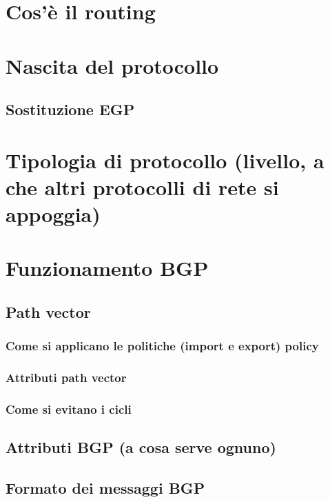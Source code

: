\documentclass[12pt,a4paper,twoside]{book}
\begin{document}
\section{Cos'è il routing}

\section{Nascita del protocollo}

\subsection{Sostituzione EGP}

\section{Tipologia di protocollo (livello, a che altri protocolli di rete si appoggia)}

\section{Funzionamento BGP}

\subsection{Path vector}

\subsubsection{Come si applicano le politiche (import e export) policy}

\subsubsection{Attributi path vector}

\subsubsection{Come si evitano i cicli}

\subsection{Attributi BGP (a cosa serve ognuno)}

\subsection{Formato dei messaggi BGP}
\end{document}
